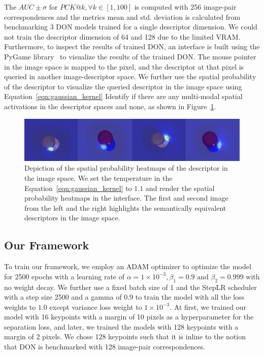 The $AUC \pm \sigma$ for $PCK@k, \forall k \in [1, 100]$ is computed with 256 image-pair correspondences and
the metrics mean and std. deviation is calculated from benchmarking 3 DON models trained for a single descriptor dimension.
We could not train the descriptor dimension of 64 and 128 due to the limited VRAM. Furthermore, to inspect the
results of trained DON, an interface is built using the PyGame library~\cite{pygame} to visualize the results of the trained DON.
The mouse pointer in the image space is mapped to the pixel, and the descriptor at that pixel is queried in another image-descriptor space.
We further use the spatial probability of the descriptor to visualize the queried descriptor
in the image space using Equation~\ref{eqn:gaussian_kernel}
Identify if there are any multi-modal spatial activations in the descriptor spaces and none, as shown in Figure~\ref{fig:check_don}.

\begin{figure}[htb]
    \centering
    \includegraphics[scale=0.25]{images/test_don.png}
    \caption{Depiction of the spatial probability heatmaps of the descriptor in the image space. We set the temperature in the Equation~\ref{eqn:gaussian_kernel} to $1.1$
        and render the spatial probability heatmaps in the interface. The first and second image from the left and the right highlights the semantically equivalent descriptors in the image space.}
    \label{fig:check_don}
\end{figure}


\subsection{Our Framework}

To train our framework, we employ an ADAM optimizer to optimize the model for 2500 epochs with a learning rate of
$\alpha = 1 \times 10^{-3}, \beta_1 = 0.9 \text{ and } \beta_2 = 0.999$ with no weight decay.
We further use a fixed batch size of 1 and the StepLR scheduler with a step size 2500 and a gamma of 0.9 to train the model with all the loss weights to $1.0$ except variance loss weight to $1 \times 10^{-3}$.
At first, we trained our model with 16 keypoints with a margin of 10 pixels as a hyperparameter for the separation loss, and later, we trained the models with 128 keypoints with a margin of 2 pixels.
We chose 128 keypoints such that it is inline to the notion that DON is benchmarked with 128 image-pair correspondences.

